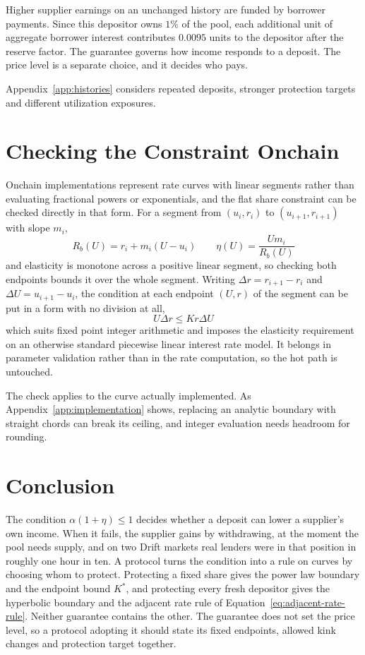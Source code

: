\documentclass[11pt,a4paper]{article}
\begin{document}
Higher supplier earnings on an unchanged history are funded by borrower payments. Since this depositor owns $1\%$ of the pool, each additional unit of aggregate borrower interest contributes $0.0095$ units to the depositor after the reserve factor. The guarantee governs how income responds to a deposit. The price level is a separate choice, and it decides who pays.

Appendix~\ref{app:histories} considers repeated deposits, stronger protection targets and different utilization exposures.

\section{Checking the Constraint Onchain}
\label{sec:onchain}

Onchain implementations represent rate curves with linear segments rather than evaluating fractional powers or exponentials, and the flat share constraint can be checked directly in that form. For a segment from $(u_i,r_i)$ to $(u_{i+1},r_{i+1})$ with slope $m_i$,
\begin{equation}
R_b(U)=r_i+m_i(U-u_i)
\qquad
\eta(U)=\frac{Um_i}{R_b(U)}
\end{equation}
and elasticity is monotone across a positive linear segment, so checking both endpoints bounds it over the whole segment. Writing $\Delta r=r_{i+1}-r_i$ and $\Delta U=u_{i+1}-u_i$, the condition at each endpoint $(U,r)$ of the segment can be put in a form with no division at all,
\begin{equation}
\boxed{
U\Delta r\leq Kr\Delta U
}
\end{equation}
which suits fixed point integer arithmetic and imposes the elasticity requirement on an otherwise standard piecewise linear interest rate model. It belongs in parameter validation rather than in the rate computation, so the hot path is untouched.

The check applies to the curve actually implemented. As Appendix~\ref{app:implementation} shows, replacing an analytic boundary with straight chords can break its ceiling, and integer evaluation needs headroom for rounding.

\section{Conclusion}

The condition $\alpha(1+\eta)\leq1$ decides whether a deposit can lower a supplier's own income. When it fails, the supplier gains by withdrawing, at the moment the pool needs supply, and on two Drift markets real lenders were in that position in roughly one hour in ten. A protocol turns the condition into a rule on curves by choosing whom to protect. Protecting a fixed share gives the power law boundary and the endpoint bound $K^*$, and protecting every fresh depositor gives the hyperbolic boundary and the adjacent rate rule of Equation~\ref{eq:adjacent-rate-rule}. Neither guarantee contains the other. The guarantee does not set the price level, so a protocol adopting it should state its fixed endpoints, allowed kink changes and protection target together.
\end{document}

